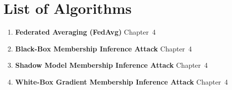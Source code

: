 \documentclass[12pt, a4paper]{report}
\begin{document}
\clearpage
{}
{}
\listoftables

\clearpage
{}
{}
\chapter*{List of Algorithms}
\begin{enumerate}[leftmargin=2em, itemsep=6pt]
  \item[1] \textbf{Federated Averaging (FedAvg)} \dotfill Chapter~4
  \item[2] \textbf{Black-Box Membership Inference Attack} \dotfill Chapter~4
  \item[3] \textbf{Shadow Model Membership Inference Attack} \dotfill Chapter~4
  \item[4] \textbf{White-Box Gradient Membership Inference Attack} \dotfill Chapter~4
\end{enumerate}
\end{document}

